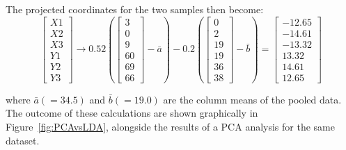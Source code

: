 The projected coordinates for the two samples then become:
\begin{equation}
  \left[
  \begin{array}{c}
    X1 \\
    X2 \\
    X3 \\
    Y1 \\
    Y2 \\
    Y3 
  \end{array}
  \right] \rightarrow 0.52
  \left(
    \left[
      \begin{array}{c}
        3 \\
        0 \\
        9 \\
        60 \\
        69 \\
        66
      \end{array}
      \right]
    - \bar{a}
    \right)
    - 0.2
    \left(
    \left[
      \begin{array}{c}
        0  \\
        2  \\
        19 \\
        19 \\
        36 \\
        38
      \end{array}
      \right] - \bar{b}
    \right)
    =
    \left[
      \begin{array}{c}
        -12.65  \\
        -14.61  \\
        -13.32 \\
        13.32 \\
        14.61 \\
        12.65
      \end{array}
      \right]    
\end{equation}

\noindent where $\bar{a} (= 34.5)$ and $\bar{b} (= 19.0)$ are the
column means of the pooled data. The outcome of these calculations are
shown graphically in Figure~\ref{fig:PCAvsLDA}, alongside the results
of a PCA analysis for the same dataset.

